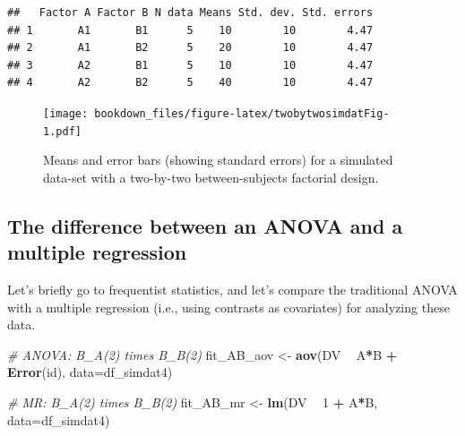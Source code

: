 \documentclass[12pt,]{krantz}
\newenvironment{Shaded}{\begin{snugshade}}{\end{snugshade}}
\newcommand{\KeywordTok}[1]{\textcolor[rgb]{0.13,0.29,0.53}{\textbf{#1}}}
\newcommand{\DataTypeTok}[1]{\textcolor[rgb]{0.13,0.29,0.53}{#1}}
\newcommand{\DecValTok}[1]{\textcolor[rgb]{0.00,0.00,0.81}{#1}}
\newcommand{\StringTok}[1]{\textcolor[rgb]{0.31,0.60,0.02}{#1}}
\newcommand{\CommentTok}[1]{\textcolor[rgb]{0.56,0.35,0.01}{\textit{#1}}}
\newcommand{\OperatorTok}[1]{\textcolor[rgb]{0.81,0.36,0.00}{\textbf{#1}}}
\newcommand{\NormalTok}[1]{#1}
\theoremstyle{definition}
\theoremstyle{definition}
\theoremstyle{definition}
\theoremstyle{remark}
\begin{document}
\begin{verbatim}
##   Factor A Factor B N data Means Std. dev. Std. errors
## 1       A1       B1      5    10        10        4.47
## 2       A1       B2      5    20        10        4.47
## 3       A2       B1      5    10        10        4.47
## 4       A2       B2      5    40        10        4.47
\end{verbatim}

\begin{figure}
\centering
\texttt{[image: bookdown\_files/figure-latex/twobytwosimdatFig-1.pdf]}
\caption{\label{fig:twobytwosimdatFig}Means and error bars (showing standard
errors) for a simulated data-set with a two-by-two between-subjects
factorial design.}
\end{figure}

\clearpage

\subsection{The difference between an ANOVA and a multiple
regression}\label{the-difference-between-an-anova-and-a-multiple-regression}

Let's briefly go to frequentist statistics, and let's compare the
traditional ANOVA with a multiple regression (i.e., using contrasts as
covariates) for analyzing these data.

\begin{Shaded}
\begin{Highlighting}[]
\CommentTok{# ANOVA: B_A(2) times B_B(2)}
\NormalTok{fit_AB_aov <-}\StringTok{ }\KeywordTok{aov}\NormalTok{(DV }\OperatorTok{~}\StringTok{ }\NormalTok{A}\OperatorTok{*}\NormalTok{B }\OperatorTok{+}\StringTok{ }\KeywordTok{Error}\NormalTok{(id), }\DataTypeTok{data=}\NormalTok{df_simdat4)}

\CommentTok{# MR: B_A(2) times B_B(2)}
\NormalTok{fit_AB_mr <-}\StringTok{ }\KeywordTok{lm}\NormalTok{(DV }\OperatorTok{~}\StringTok{ }\DecValTok{1} \OperatorTok{+}\StringTok{ }\NormalTok{A}\OperatorTok{*}\NormalTok{B, }\DataTypeTok{data=}\NormalTok{df_simdat4)}
\end{Highlighting}
\end{Shaded}

\begin{Shaded}
\end{Shaded}
\end{document}
